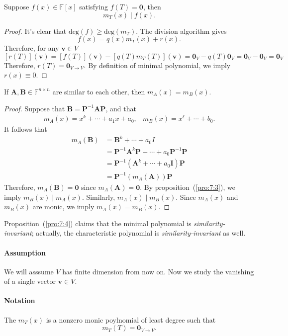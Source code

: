 \begin{proposition}\label{pro:7:3}
Suppose $f(x)\in\mathbb{F}[x]$ satisfying $f(T)=\bm0$, then
\[
m_T(x)\mid f(x).
\]
\end{proposition}
\begin{proof}
It's clear that $\text{deg}(f)\ge\text{deg}(m_T)$.
The division algorithm gives 
\[
f(x)=q(x)m_T(x)+r(x).
\]
Therefore, for any $\bm v\in V$
\[
[r(T)](\bm v) = [f(T)](\bm v) - [q(T)m_T(T)](\bm v)=\bm0_V-q(T)\bm0_{V}=\bm0_V-\bm0_V=\bm0_{V}
\]
Therefore, $r(T) = \bm0_{V\to V}$.
By definition of minimal polynomial, we imply $r(x)\equiv0$.
\end{proof}
\begin{proposition}\label{pro:7:4}
If $\bm A,\bm B\in\mathbb{F}^{n\times n}$ are similar to each other, then $m_A(x) = m_B(x)$.
\end{proposition}
\begin{proof}
Suppose that $\bm B= \bm P^{-1}\bm A\bm P$, and that 
\[
\begin{array}{ll}
m_A(x)=x^k+\cdots+a_1x+a_0,
&
m_B(x)=x^{\ell}+\cdots+b_0.
\end{array}
\]
It follows that
\begin{align*}
m_A(\bm B)&=\bm B^k+\cdots+a_0I\\
&=\bm P^{-1}\bm A^k\bm P+\cdots+a_0\bm P^{-1}\bm P\\
&=\bm P^{-1}(\bm A^k+\cdots+a_0\bm I)\bm P\\
&=\bm P^{-1}(m_{A}(\bm A))\bm P
\end{align*}
Therefore, $m_A(\bm B)=\bm0$ since $m_{A}(\bm A)=\bm0$. By proposition~(\ref{pro:7:3}), we imply $m_{B}(x)\mid m_{A}(x)$. 
Similarly, $m_A(x)\mid m_B(x)$. 
Since $m_A(x)$ and $m_B(x)$ are monic, we imply $m_A(x)=m_B(x)$.
\end{proof}
\begin{remark}
Proposition~(\ref{pro:7:4}) claims that the minimal polynomial is \emph{similarity-invariant}; actually, the characteristic polynomial is \emph{similarity-invariant} as well.
\end{remark}
\paragraph{Assumption}
We will asssume $V$ has finite dimension from now on.
Now we study the vanishing of a single vector $\bm v\in V$.
\paragraph{Notation}
The $m_T(x)$ is a nonzero monic poylnomial of least degree such that 
\[
m_T(T)=\bm0_{V\to V}.
\]
